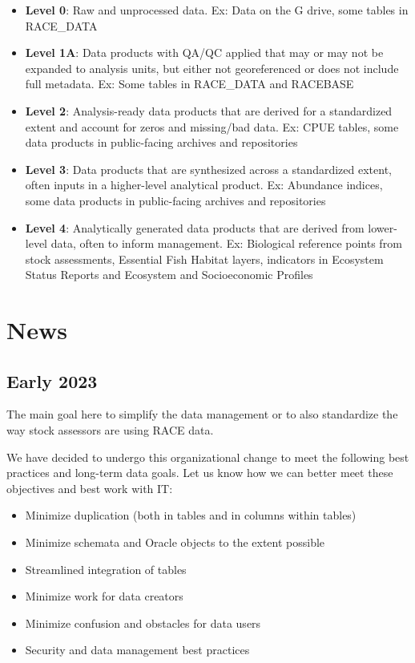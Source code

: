 \documentclass[
  letterpaper,
  oneside,
  open=any]{scrbook}
\providecommand{\tightlist}{%
  \setlength{\itemsep}{0pt}\setlength{\parskip}{0pt}}\usepackage{longtable,booktabs,array}
\begin{document}
\begin{itemize}
\tightlist
\item
  \textbf{Level 0}: Raw and unprocessed data. Ex: Data on the G drive,
  some tables in RACE\_DATA
\item
  \textbf{Level 1A}: Data products with QA/QC applied that may or may
  not be expanded to analysis units, but either not georeferenced or
  does not include full metadata. Ex: Some tables in RACE\_DATA and
  RACEBASE
\item
  \textbf{Level 2}: Analysis-ready data products that are derived for a
  standardized extent and account for zeros and missing/bad data. Ex:
  CPUE tables, some data products in public-facing archives and
  repositories
\item
  \textbf{Level 3}: Data products that are synthesized across a
  standardized extent, often inputs in a higher-level analytical
  product. Ex: Abundance indices, some data products in public-facing
  archives and repositories
\item
  \textbf{Level 4}: Analytically generated data products that are
  derived from lower-level data, often to inform management. Ex:
  Biological reference points from stock assessments, Essential Fish
  Habitat layers, indicators in Ecosystem Status Reports and Ecosystem
  and Socioeconomic Profiles
\end{itemize}

\hypertarget{news}{%
\chapter{News}\label{news}}

\hypertarget{early-2023}{%
\section{Early 2023}\label{early-2023}}

The main goal here to simplify the data management or to also
standardize the way stock assessors are using RACE data.

We have decided to undergo this organizational change to meet the
following best practices and long-term data goals. Let us know how we
can better meet these objectives and best work with IT:

\begin{itemize}
\tightlist
\item
  Minimize duplication (both in tables and in columns within tables)
\item
  Minimize schemata and Oracle objects to the extent possible
\item
  Streamlined integration of tables
\item
  Minimize work for data creators
\item
  Minimize confusion and obstacles for data users
\item
  Security and data management best practices
\end{itemize}
\end{document}
